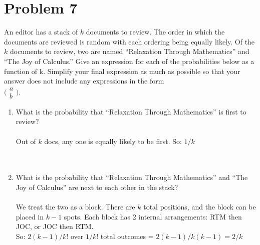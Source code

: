 \documentclass{amsart}
\theoremstyle{definition}
\theoremstyle{Exercise}
\theoremstyle{remark}
\theoremstyle{rule}
\numberwithin{equation}{section}
\begin{document}
\section*{Problem 7}
An editor has a stack of $k$ documents to review.  The order in which the documents are reviewed is random with each ordering being equally likely. Of the $k$ documents to review, two are named ``Relaxation Through Mathematics'' and ``The Joy of Calculus.'' Give an expression for each of the probabilities below as a function of k. Simplify your final expression as much as possible so that your answer does not include any expressions in the form\\
$
\Big(
 \begin{array}{c}
 a\\
 b
    \end{array}
    \Big)
$.
 \begin{enumerate}[label=(\alph*)]
\item What is the probability that ``Relaxation Through Mathematics'' is first to review?\\\\
Out of $k$ docs, any one is equally likely to be first. So:
$1/k$\\

\\\\
\item What is the probability that ``Relaxation Through Mathematics'' and ``The Joy of Calculus'' are next to each other in the stack?\\\\
We treat the two as a block. There are $k$ total positions, and the block can be placed in $k-1$ spots.
Each block has 2 internal arrangements: RTM then JOC, or JOC then RTM.\\
So: $2(k - 1)/k!$ over $1/k!$ total outcomes = $2(k - 1)/k(k - 1) = 2/k$\\
\\\\
\end{enumerate}
\end{document}
